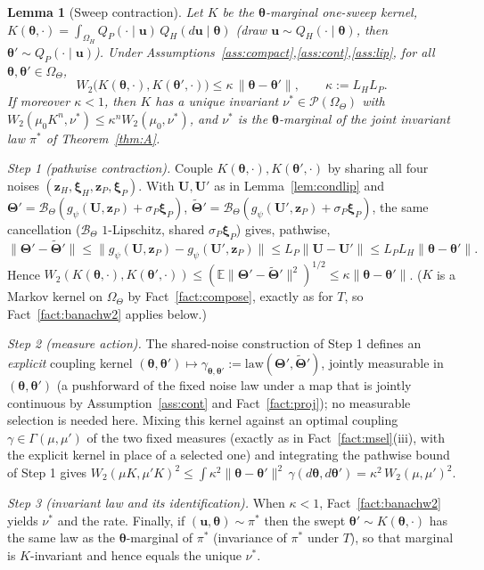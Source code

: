 \documentclass[11pt]{article}
\makeatletter
\theoremstyle{definitionbreak}
\theoremstyle{plainbreak}
\newtheorem{lemma}[theorem]{Lemma}
\theoremstyle{remarkbreak}
\renewenvironment{proof}[1][\proofname]{\par
  \pushQED{\qed}\normalfont
  \topsep6\p@\@plus6\p@\relax
  \trivlist
  \item[\hskip\labelsep\itshape #1\@addpunct{.}]\mbox{}\par\nobreak\ignorespaces
}{\popQED\endtrivlist\@endpefalse}
\newcommand{\E}{\mathbb{E}}
\newcommand{\cP}{\mathcal{P}}
\newcommand{\Om}{\Omega}
\newcommand{\bth}{\bm{\theta}}
\newcommand{\norm}[1]{\lVert #1 \rVert}
\makeatother
\begin{document}
\begin{lemma}[Sweep contraction]
\label{lem:sweep}
Let $K$ be the $\bth$-marginal one-sweep kernel,
$K(\bth,\cdot)=\int_{\Om_H}Q_P(\cdot\mid\bm u)\,Q_H(d\bm u\mid\bth)$ (draw $\bm u\sim Q_H(\cdot\mid\bth)$,
then $\bth'\sim Q_P(\cdot\mid\bm u)$). Under Assumptions~\ref{ass:compact},\ref{ass:cont},\ref{ass:lip},
for all $\bth,\bth'\in\Om_\Theta$,
\[
  W_2\big(K(\bth,\cdot),K(\bth',\cdot)\big)\le\kappa\,\norm{\bth-\bth'},\qquad \kappa:=L_HL_P .
\]
If moreover $\kappa<1$, then $K$ has a unique invariant $\nu^\ast\in\cP(\Om_\Theta)$ with
$W_2(\mu_0K^n,\nu^\ast)\le\kappa^n W_2(\mu_0,\nu^\ast)$, and $\nu^\ast$ is the $\bth$-marginal of the
joint invariant law $\pi^\ast$ of Theorem~\ref{thm:A}.
\end{lemma}
\begin{proof}
\emph{Step 1 (pathwise contraction).} Couple $K(\bth,\cdot),K(\bth',\cdot)$ by sharing all four
noises $(\bm z_H,\bm\xi_H,\bm z_P,\bm\xi_P)$. With $\bm U,\bm U'$ as in Lemma~\ref{lem:condlip} and
$\bm\Theta'=\mathcal B_\Theta(g_\psi(\bm U,\bm z_P)+\sigma_P\bm\xi_P)$,
$\tilde{\bm\Theta}'=\mathcal B_\Theta(g_\psi(\bm U',\bm z_P)+\sigma_P\bm\xi_P)$, the same cancellation
($\mathcal B_\Theta$ $1$-Lipschitz, shared $\sigma_P\bm\xi_P$) gives, pathwise,
\[
  \norm{\bm\Theta'-\tilde{\bm\Theta}'}\le\norm{g_\psi(\bm U,\bm z_P)-g_\psi(\bm U',\bm z_P)}
  \le L_P\norm{\bm U-\bm U'}\le L_PL_H\norm{\bth-\bth'}.
\]
Hence $W_2(K(\bth,\cdot),K(\bth',\cdot))\le(\E\norm{\bm\Theta'-\tilde{\bm\Theta}'}^2)^{1/2}\le\kappa\norm{\bth-\bth'}$.
($K$ is a Markov kernel on $\Om_\Theta$ by Fact~\ref{fact:compose}, exactly as for $T$, so
Fact~\ref{fact:banachw2} applies below.)

\emph{Step 2 (measure action).} The shared-noise construction of Step 1 defines an \emph{explicit}
coupling kernel $(\bth,\bth')\mapsto\gamma_{\bth,\bth'}:=\mathrm{law}(\bm\Theta',\tilde{\bm\Theta}')$,
jointly measurable in $(\bth,\bth')$ (a pushforward of the fixed noise law under a map that is jointly
continuous by Assumption~\ref{ass:cont} and Fact~\ref{fact:proj}); no measurable selection is needed
here. Mixing this kernel against an optimal coupling $\gamma\in\Gamma(\mu,\mu')$ of the two fixed
measures (exactly as in Fact~\ref{fact:msel}(iii), with the explicit kernel in place of a selected
one) and integrating the pathwise bound of Step 1 gives
$W_2(\mu K,\mu'K)^2\le\int\kappa^2\norm{\bth-\bth'}^2\,\gamma(d\bth,d\bth')=\kappa^2\,W_2(\mu,\mu')^2$.

\emph{Step 3 (invariant law and its identification).} When $\kappa<1$, Fact~\ref{fact:banachw2}
yields $\nu^\ast$ and the rate. Finally, if $(\bm u,\bth)\sim\pi^\ast$ then the swept
$\bth'\sim K(\bth,\cdot)$ has the same law as the $\bth$-marginal of $\pi^\ast$ (invariance of
$\pi^\ast$ under $T$), so that marginal is $K$-invariant and hence equals the unique $\nu^\ast$.
\end{proof}
\end{document}

